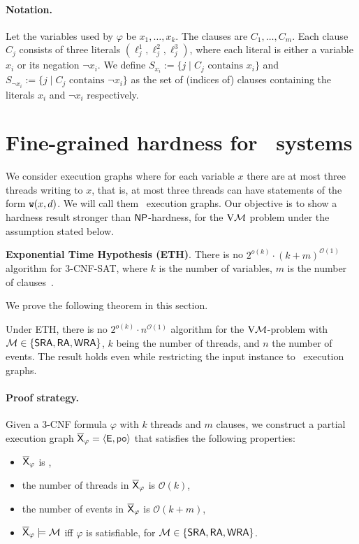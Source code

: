 \paragraph*{Notation.} Let the variables used by $\varphi$ be $x_1, \dots, x_k$. The clauses are $C_1, \dots, C_m$. Each clause $C_j$ consists of three literals $(\ell_j^1, \ell_j^2, \ell_j^3)$, where each literal is either a variable $x_i$ or its negation $\neg x_i$. We define $S_{x_i} := \{j \mid C_j \text{ contains } x_i\}$ and $S_{\neg x_i} := \{ j \mid C_j \text{ contains } \neg x_i\}$ as the set of (indices of) clauses containing the literals $x_i$ and $\neg x_i$ respectively.

\section{Fine-grained hardness for  \threewriter\ systems}\label{sec:hardness}
\label{sec:hardness-threewriter}
We consider execution graphs where for each variable $x$ there are at most three threads writing to $x$, that is, at most three threads can have statements of the form $\mathtt{w}(x, d)$. We will call them \threewriter\ execution graphs. 
Our objective is to show a hardness result stronger than $\mathsf{NP}$-hardness, for the $\mathrm{V}\mathcal{M}$ problem under the assumption stated below.

\noindent \textbf{Exponential Time Hypothesis (ETH)}. There is no $2^{o(k)}\cdot (k+m)^{\mathcal{O}(1)}$ algorithm for 3-CNF-SAT, where $k$ is the number of variables, $m$ is the number of clauses~\cite{ImpagliazzoPZ01,Lokshtanov:ETH:2011}.

We prove the following theorem in this section. 

\begin{theorem}\label{thm:eth-hardness}
    Under ETH, there is no $2^{o(k)} \cdot n^{\mathcal{O}(1)}$ algorithm for the $\mathrm{V}\mathcal{M}$-problem with $\mathcal{M} \in \{ \mathsf{SRA}, \mathsf{RA}, \mathsf{WRA}\}$, $k$ being the number of threads, and $n$ the number of events. The result holds even while restricting the input instance to \threewriter\ execution graphs.
\end{theorem}

\paragraph*{Proof strategy.} Given a 3-CNF formula $\varphi$ with $k$ threads and $m$ clauses, we construct a partial execution graph $\expartial_\varphi = \tuple{\E, \po}$ that satisfies the following properties:
\begin{itemize}
\item $\overline{\mathsf{\color{black}X}}_\varphi$ is \threewriter,
\item the number of threads in $\overline{\mathsf{\color{black}X}}_\varphi$ is $\mathcal{O}(k)$,
\item the number of events in $\overline{\mathsf{\color{black}X}}_\varphi$ is $\mathcal{O}(k + m)$, 
\item $\overline{\mathsf{\color{black}X}}_\varphi \models \mathcal{M}$ iff $\varphi$ is satisfiable, for $\mathcal{M} \in \{\mathsf{SRA}, \mathsf{RA}, \mathsf{WRA}\}$. 
\end{itemize} 

